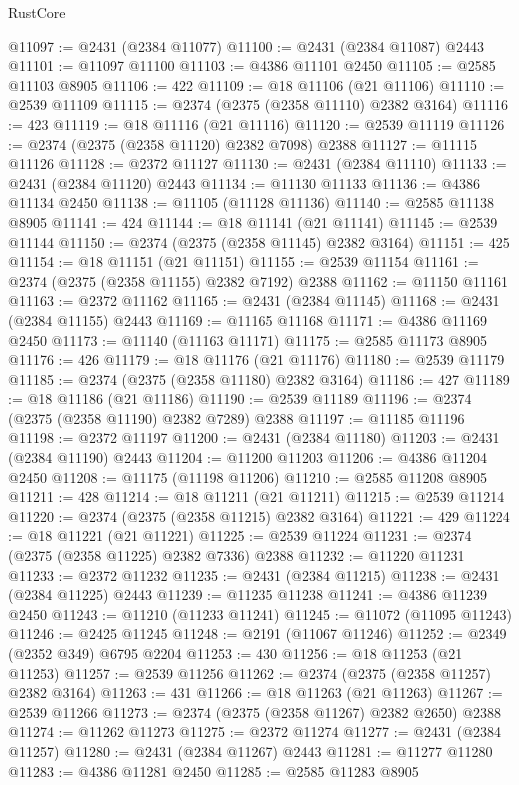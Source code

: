 \begin{lexlean}{RustCore}
\begin{coremodule}
@11097 := @2431 (@2384 @11077)
@11100 := @2431 (@2384 @11087) @2443
@11101 := @11097 @11100
@11103 := @4386 @11101 @2450
@11105 := @2585 @11103 @8905
@11106 := 422
@11109 := @18 @11106 (@21 @11106)
@11110 := @2539 @11109
@11115 := @2374 (@2375 (@2358 @11110) @2382 @3164)
@11116 := 423
@11119 := @18 @11116 (@21 @11116)
@11120 := @2539 @11119
@11126 := @2374 (@2375 (@2358 @11120) @2382 @7098) @2388
@11127 := @11115 @11126
@11128 := @2372 @11127
@11130 := @2431 (@2384 @11110)
@11133 := @2431 (@2384 @11120) @2443
@11134 := @11130 @11133
@11136 := @4386 @11134 @2450
@11138 := @11105 (@11128 @11136)
@11140 := @2585 @11138 @8905
@11141 := 424
@11144 := @18 @11141 (@21 @11141)
@11145 := @2539 @11144
@11150 := @2374 (@2375 (@2358 @11145) @2382 @3164)
@11151 := 425
@11154 := @18 @11151 (@21 @11151)
@11155 := @2539 @11154
@11161 := @2374 (@2375 (@2358 @11155) @2382 @7192) @2388
@11162 := @11150 @11161
@11163 := @2372 @11162
@11165 := @2431 (@2384 @11145)
@11168 := @2431 (@2384 @11155) @2443
@11169 := @11165 @11168
@11171 := @4386 @11169 @2450
@11173 := @11140 (@11163 @11171)
@11175 := @2585 @11173 @8905
@11176 := 426
@11179 := @18 @11176 (@21 @11176)
@11180 := @2539 @11179
@11185 := @2374 (@2375 (@2358 @11180) @2382 @3164)
@11186 := 427
@11189 := @18 @11186 (@21 @11186)
@11190 := @2539 @11189
@11196 := @2374 (@2375 (@2358 @11190) @2382 @7289) @2388
@11197 := @11185 @11196
@11198 := @2372 @11197
@11200 := @2431 (@2384 @11180)
@11203 := @2431 (@2384 @11190) @2443
@11204 := @11200 @11203
@11206 := @4386 @11204 @2450
@11208 := @11175 (@11198 @11206)
@11210 := @2585 @11208 @8905
@11211 := 428
@11214 := @18 @11211 (@21 @11211)
@11215 := @2539 @11214
@11220 := @2374 (@2375 (@2358 @11215) @2382 @3164)
@11221 := 429
@11224 := @18 @11221 (@21 @11221)
@11225 := @2539 @11224
@11231 := @2374 (@2375 (@2358 @11225) @2382 @7336) @2388
@11232 := @11220 @11231
@11233 := @2372 @11232
@11235 := @2431 (@2384 @11215)
@11238 := @2431 (@2384 @11225) @2443
@11239 := @11235 @11238
@11241 := @4386 @11239 @2450
@11243 := @11210 (@11233 @11241)
@11245 := @11072 (@11095 @11243)
@11246 := @2425 @11245
@11248 := @2191 (@11067 @11246)
@11252 := @2349 (@2352 @349) @6795 @2204
@11253 := 430
@11256 := @18 @11253 (@21 @11253)
@11257 := @2539 @11256
@11262 := @2374 (@2375 (@2358 @11257) @2382 @3164)
@11263 := 431
@11266 := @18 @11263 (@21 @11263)
@11267 := @2539 @11266
@11273 := @2374 (@2375 (@2358 @11267) @2382 @2650) @2388
@11274 := @11262 @11273
@11275 := @2372 @11274
@11277 := @2431 (@2384 @11257)
@11280 := @2431 (@2384 @11267) @2443
@11281 := @11277 @11280
@11283 := @4386 @11281 @2450
@11285 := @2585 @11283 @8905

\end{coremodule}
\end{lexlean}
